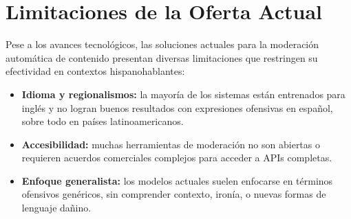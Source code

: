 \section{Limitaciones de la Oferta Actual}

Pese a los avances tecnológicos, las soluciones actuales para la moderación automática de contenido presentan diversas limitaciones que restringen su efectividad en contextos hispanohablantes:

\begin{itemize}
    \item \textbf{Idioma y regionalismos:} la mayoría de los sistemas están entrenados para inglés y no logran buenos resultados con expresiones ofensivas en español, sobre todo en países latinoamericanos.
    \item \textbf{Accesibilidad:} muchas herramientas de moderación no son abiertas o requieren acuerdos comerciales complejos para acceder a APIs completas.
    \item \textbf{Enfoque generalista:} los modelos actuales suelen enfocarse en términos ofensivos genéricos, sin comprender contexto, ironía, o nuevas formas de lenguaje dañino.
\end{itemize}







